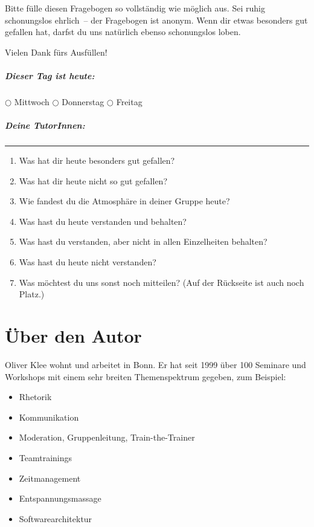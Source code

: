 Bitte fülle diesen Fragebogen so vollständig wie möglich aus. Sei ruhig schonungslos ehrlich~-- der Fragebogen ist anonym. Wenn dir etwas besonders gut gefallen hat, darfst du uns natürlich ebenso schonungslos loben.

Vielen Dank fürs Ausfüllen!

\smallskip
\paragraph*{Dieser Tag ist heute:} $\bigcirc$ Mittwoch \hspace{1cm} $\bigcirc$ Donnerstag \hspace{1cm} $\bigcirc$ Freitag

\paragraph*{Deine TutorInnen:} \rule{10cm}{0,3pt}

\bigskip

\begin{enumerate}
\item Was hat dir heute besonders gut gefallen?
\vspace{1,0cm}
\item Was hat dir heute nicht so gut gefallen?
\vspace{1,0cm}
\item Wie fandest du die Atmosphäre in deiner Gruppe heute?
\vspace{1,0cm}
\item Was hast du heute verstanden und behalten?
\vspace{1,0cm}
\item Was hast du verstanden, aber nicht in allen Einzelheiten behalten?
\vspace{1,0cm}
\item Was hast du heute nicht verstanden?
\vspace{1,0cm}
\item Was möchtest du uns sonst noch mitteilen? (Auf der Rückseite ist auch noch Platz.)
\end{enumerate}

\chapter{Über den Autor}
Oliver Klee wohnt und arbeitet in Bonn. Er hat seit 1999 über 100 Seminare und Workshops mit einem sehr breiten Themenspektrum gegeben, zum Beispiel:
\begin{itemize}
  \item Rhetorik
  \item Kommunikation
  \item Moderation, Gruppenleitung, Train-the-Trainer
  \item Teamtrainings
  \item Zeitmanagement
  \item Entspannungsmassage
  \item Softwarearchitektur
\end{itemize}

